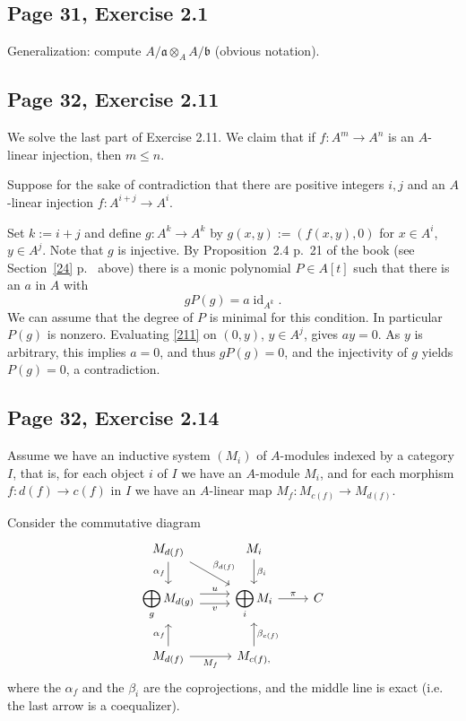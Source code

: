 \documentclass[parskip=half,fontsize=12pt]{scrartcl}%
\newcommand{\oo}{\operatorname}\newcommand{\ooo}{\operatorname*}
\newcommand{\mf}{\mathfrak}
\newcommand{\aaa}{\mf a}
\newcommand{\bbb}{\mf b}
\newcommand{\ds}{\displaystyle}
\begin{document}
\subsection{Page 31, Exercise 2.1}%

Generalization: compute $A/\aaa\otimes_AA/\bbb$ (obvious notation).

\subsection{Page 32, Exercise 2.11}%

We solve the last part of Exercise 2.11. We claim that if $f:A^m\to A^n$ is an $A$-linear injection, then $m\le n$. 

Suppose for the sake of contradiction that there are positive integers $i,j$ and an $A$-linear injection $f:A^{i+j}\to A^i$. 

Set $k:=i+j$ and define $g:A^k\to A^k$ by $g(x,y):=(f(x,y),0)$ for $x\in A^i$, $y\in A^j$. Note that $g$ is injective. By Proposition~2.4 p.~21 of the book (see Section~\ref{24} p.~\pageref{24} above) there is a monic polynomial $P\in A[t]$ such that there is an $a$ in $A$ with 
\begin{equation}\label{211}
gP(g)=a\oo{id}_{A^k}.
\end{equation} 
We can assume that the degree of $P$ is minimal for this condition. In particular $P(g)$ is nonzero. Evaluating \eqref{211} on $(0,y)$, $y\in A^j$, gives $ay=0$. As $y$ is arbitrary, this implies $a=0$, and thus $gP(g)=0$, and the injectivity of $g$ yields $P(g)=0$, a contradiction. 

\subsection{Page 32, Exercise 2.14}\label{colim}%

Assume we have an inductive system $(M_i)$ of $A$-modules indexed by a category  $I$, that is, for each object $i$ of $I$ we have an $A$-module $M_i$, and for each morphism $f:d(f)\to c(f)$ in $I$ we have an $A$-linear map $M_f:M_{c(f)}\to M_{d(f)}$. 

Consider the commutative diagram %
$$
\begin{tikzcd}
M_{d(f)}\ar[d,"\alpha_{f}"']\ar[dr,"\beta_{d(f)}"]&M_i\ar[d,"\beta_i"]\\ 
\ds\bigoplus_gM_{d(g)}\ar[r,yshift=0.9ex,"u"]\ar[r,yshift=-0.9ex,"v"']&\ds\bigoplus_iM_i\ar[r,"\pi"]&C\\ 
M_{d(f)}\ar[u,"\alpha_{f}"]\ar[r,"M_f"']&M_{c(f),}\ar[u,"\beta_{c(f)}"']
\end{tikzcd}
$$ 
where the $\alpha_f$ and the $\beta_i$ are the coprojections, and the middle line is exact (i.e. the last arrow is a coequalizer). 
\end{document}
